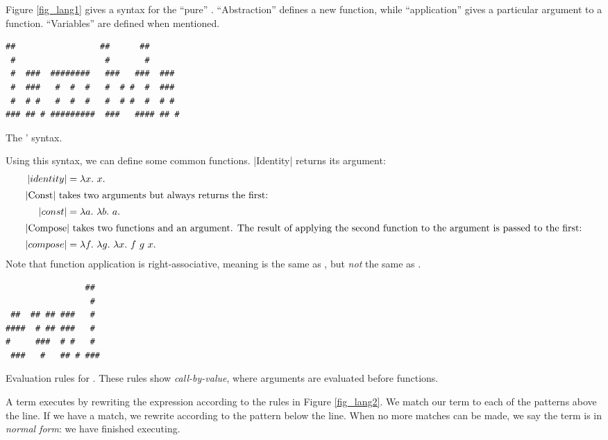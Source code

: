 \documentclass[12pt]{report}
\begin{document}
Figure \ref{fig_lang1} gives a syntax for the ``pure''
\lamA. ``Abstraction'' defines a new function, while ``application''
gives a particular argument to a function. ``Variables'' are defined
when mentioned. 

\begin{myfig}[ht]
\begin{minipage}{3in}
\begin{Verbatim}
##                 ##      ##       
 #                  #       #       
 #  ###  ########   ###   ###  ###  
 #  ###   #  #  #   #  # #  #  ###  
 #  # #   #  #  #   #  # #  #  # #  
### ## # #########  ###   #### ## # 
\end{Verbatim}
\end{minipage}
  \caption{The \lamA' syntax.}
  \label{fig_lang1}
\end{myfig}


Using this syntax, we can define some common functions. |Identity|
returns its argument:
\begin{align}
  |identity| &= \lambda x.\ x. \label{eq_lang2} \\
  \intertext{|Const| takes two arguments but always returns the first:}
  |const| &= \lambda a.\ \lambda b.\ a. \label{eq_lang4} \\
  \intertext{|Compose| takes two functions and an argument. The result of
    applying the second function to the argument is passed to the first:}
  |compose| &= \lambda f.\ \lambda g.\ \lambda x.\ f\ g\ x. \label{eq_lang3} 
\end{align}
Note that function application is right-associative, meaning
 is the same as ,
but \emph{not} the same as .

\begin{myfig}[bt]
\begin{minipage}{2in}
\begin{Verbatim}
                ##  
                 #  
 ##  ## ## ###   #  
####  # ## ###   #  
#     ###  # #   #  
 ###   #   ## # ### 
\end{Verbatim}
\end{minipage}
  \caption{Evaluation rules for \lamA. These rules show 
    \emph{call-by-value}, where arguments are evaluated
    before functions.}
  \label{fig_lang2}
\end{myfig}

A \lamA term executes by rewriting the expression according to the
rules in Figure \ref{fig_lang2}. We match our term to each of the
patterns above the line. If we have a match, we rewrite according to
the pattern below the line. When no more matches can be made, we say
the term is in \emph{normal form}: we have finished executing.
\end{document}
